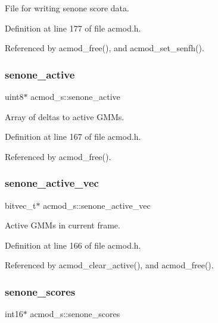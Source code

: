 File for writing senone score data. 



Definition at line 177 of file acmod.\+h.



Referenced by acmod\+\_\+free(), and acmod\+\_\+set\+\_\+senfh().

\mbox{\label{structacmod__s_a5c98c727daf4e6bb23534e00b30cb5c2}} 
\subsubsection{senone\+\_\+active}
{\footnotesize\ttfamily uint8$\ast$ acmod\+\_\+s\+::senone\+\_\+active}



Array of deltas to active G\+M\+Ms. 



Definition at line 167 of file acmod.\+h.



Referenced by acmod\+\_\+free().

\mbox{\label{structacmod__s_a4a3ad3a3dc9a7b36c024c77729012e55}} 
\subsubsection{senone\+\_\+active\+\_\+vec}
{\footnotesize\ttfamily bitvec\+\_\+t$\ast$ acmod\+\_\+s\+::senone\+\_\+active\+\_\+vec}



Active G\+M\+Ms in current frame. 



Definition at line 166 of file acmod.\+h.



Referenced by acmod\+\_\+clear\+\_\+active(), and acmod\+\_\+free().

\mbox{\label{structacmod__s_aa341539b98a5b13bef8589fc8d948da8}} 
\subsubsection{senone\+\_\+scores}
{\footnotesize\ttfamily int16$\ast$ acmod\+\_\+s\+::senone\+\_\+scores}



